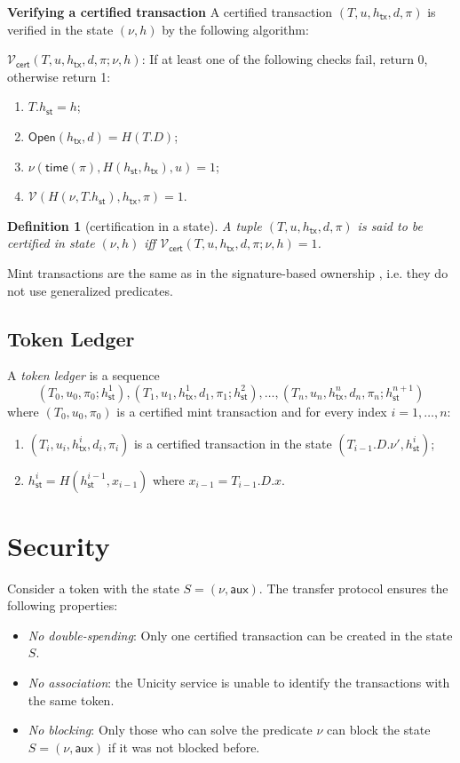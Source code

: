 \documentclass{article}
\newtheorem{definition}{Definition}[section]
\newcommand{\open}[0]{\mathsf{Open}}
\newcommand{\sthash}[0]{h_\mathsf{st}}
\newcommand{\txhash}[0]{h_\mathsf{tx}}
\newcommand{\auxd}[0]{\mathsf{aux}}
\newcommand{\univer}[0]{\mathcal{V}}
\newcommand{\certver}[0]{\mathcal{V}_\mathsf{cert}}
\newcommand{\predi}[0]{\nu}
\newcommand{\exttime}[0]{\mathsf{time}}
\begin{document}
\noindent\textbf{Verifying a certified transaction} A certified transaction $(T,u,\txhash,d,\pi)$ is verified in the state $(\predi,h)$ by the following algorithm:\medskip

\noindent $\certver(T,u,\txhash,d,\pi;\predi,h)$:
If at least one of the following checks fail, return 0, otherwise return 1:
\begin{enumerate}
\item $T.\sthash=h$;
\item $\open(\txhash,d)=H(T.D)$;
\item $\predi(\exttime(\pi), H(\sthash,\txhash),u)=1$;
\item $\univer(H(\predi,T.\sthash),\txhash,\pi)=1$.
\end{enumerate}

\begin{definition}[certification in a state]\label{de:certstate-pred}
A tuple $(T,u,\txhash,d,\pi)$ is said to be \emph{certified in state} $(\predi,h)$ iff $\certver(T,u,\txhash,d,\pi;\predi,h)=1$.
\end{definition}

Mint transactions are the same as in the signature-based ownership \cite{BTLR25}, i.e. they do not use generalized predicates.

\subsection{Token Ledger}

A \emph{token ledger} is a sequence
\[
(T_0, u_0, \pi_0; h^1_\mathsf{st}), (T_1, u_1,\txhash^1,d_1,\pi_1; h^2_\mathsf{st}), \ldots, (T_n, u_n, \txhash^n, d_n,\pi_n; h^{n+1}_\mathsf{st})
\]
where $(T_0, u_0, \pi_0)$ is a certified mint transaction and for every index $i=1,\ldots, n$:
\begin{enumerate}
\item $(T_{i}, u_{i}, \txhash^i,d_i, \pi_{i})$ is a certified transaction in the state $(T_{i-1}.D.\predi', h^{i}_\mathsf{st})$;
\item $h^{i}_\mathsf{st}=H(h^{i-1}_\mathsf{st},x_{i-1})$ where $x_{i-1} =T_{i-1}.D.x$.
\end{enumerate}

\section{Security}\label{sec:security}

Consider a token with the state $S = (\predi, \auxd)$. The transfer protocol ensures the following properties:
\begin{itemize}
\item \emph{No double-spending}:
Only one certified transaction can be created in the state $S$.
\item \emph{No association}: the Unicity service is unable to identify the transactions with the same token.
\item \emph{No blocking}:
Only those who can solve the predicate $\predi$ can block the state $S = (\predi, \auxd)$ if it was not blocked before.
\end{itemize}
\end{document}
